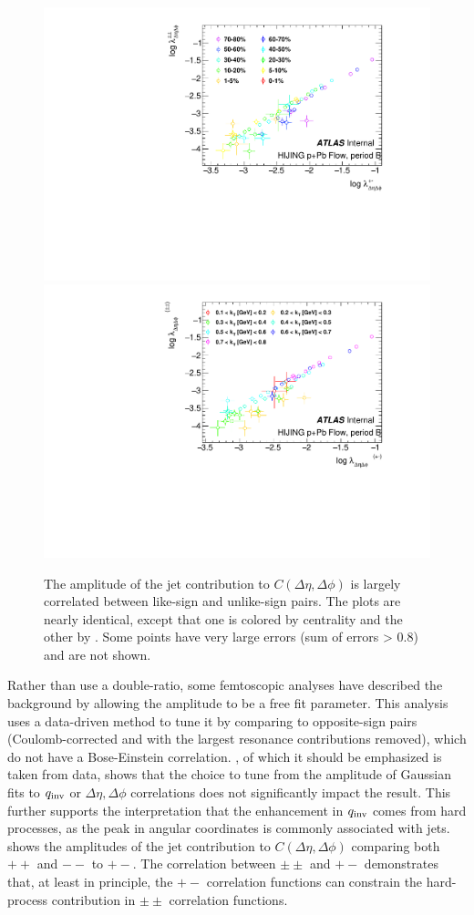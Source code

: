 \begin{figure}[t]
\centering
\includegraphics[width=.49\linewidth]{ang_lambda_opp_vs_same_MC.pdf}
\includegraphics[width=.49\linewidth]{ang_lambda_kt_opp_vs_same_MC.pdf}
\caption{The amplitude of the jet contribution to $C(\Delta\eta, \Delta\phi)$ is largely correlated between like-sign and unlike-sign pairs. The plots are nearly identical, except that one is colored by centrality and the other by \kt. Some points have very large errors (sum of errors > 0.8) and are not shown.}
\label{fig:background_ang_same_vs_opp_mc}
\end{figure}

Rather than use a double-ratio, some femtoscopic analyses have described the background by allowing the amplitude to be a free fit parameter.
This analysis uses a data-driven method to tune it by comparing to opposite-sign pairs (Coulomb-corrected and with the largest resonance contributions removed), which do not have a Bose-Einstein correlation.
, of which it should be emphasized is taken from data, shows that the choice to tune from the amplitude of Gaussian fits to $q_{\mathrm{inv}}$ or $\Delta\eta, \Delta\phi$ correlations does not significantly impact the result.
This further supports the interpretation that the enhancement in $q_{\mathrm{inv}}$ comes from hard processes, as the peak in angular coordinates is commonly associated with jets.
 shows the amplitudes of the jet contribution to $C(\Delta\eta, \Delta\phi)$ comparing both $++$ and $--$ to $+-$.
The correlation between $\pm\pm$ and $+-$ demonstrates that, at least in principle, the $+-$ correlation functions can constrain the hard-process contribution in $\pm\pm$ correlation functions.

